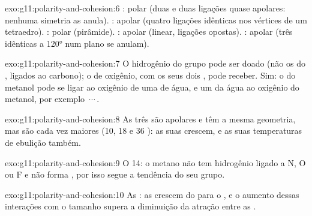 \begin{solution}{exo:g11:polarity-and-cohesion:6}
: polar (duas   e duas ligações
 quase apolares: nenhuma simetria as anula). : apolar
(quatro ligações idênticas nos vértices de um tetraedro). :
polar (pirâmide). : apolar (linear, ligações opostas). :
apolar (três  idênticas a \ang{120} num plano se
anulam).
\end{solution}

\begin{solution}{exo:g11:polarity-and-cohesion:7}
O hidrogênio do grupo  pode ser doado (não os do ,
ligados ao carbono); o  de oxigênio, com os seus dois , pode receber. Sim: o  do metanol pode se ligar ao
oxigênio de uma  de água, e um  da água ao oxigênio do
metanol, por exemplo \,$\cdots$\,.
\end{solution}

\begin{solution}{exo:g11:polarity-and-cohesion:8}
As três  são apolares e têm a mesma geometria, mas são cada vez
maiores (10, 18 e 36 ): as suas 
crescem, e as suas temperaturas de ebulição também.
\end{solution}

\begin{solution}{exo:g11:polarity-and-cohesion:9}
O  14: o metano não tem hidrogênio ligado a N, O ou F e não forma
, por isso segue a tendência do seu grupo.
\end{solution}

\begin{solution}{exo:g11:polarity-and-cohesion:10}
As : as  crescem do  para o
, e o aumento dessas interações com o tamanho supera a diminuição
da atração entre as .
\end{solution}

